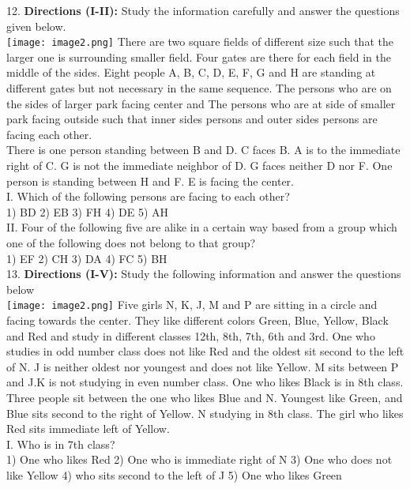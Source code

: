 \documentclass[
]{article}
\begin{document}
12. \textbf{Directions (I-II):} Study the information carefully and answer the questions given below.\\
\texttt{[image: image2.png]}
There are two square fields of different size such that the larger one is surrounding smaller
field. Four gates are there for each field in the middle of the sides. Eight people A, B, C, D, E,
F, G and H are standing at different gates but not necessary in the same sequence. The
persons who are on the sides of larger park facing center and The persons who are at side of
smaller park facing outside such that inner sides persons and outer sides persons are facing
each other.\\
There is one person standing between B and D. C faces B. A is to the immediate right of C. G
is not the immediate neighbor of D. G faces neither D nor F. One person is standing between
H and F. E is facing the center.\\

I. Which of the following persons are facing to each other?\\
1) BD \hspace{2mm}2) EB \hspace{2mm}3) FH \hspace{2mm}4) DE \hspace{2mm}5) AH\\

II. Four of the following five are alike in a certain way based from a group which one of the
following does not belong to that group?\\
1) EF \hspace{2mm}2) CH \hspace{2mm}3) DA \hspace{2mm}4) FC \hspace{2mm}5) BH\\

13. \textbf{Directions (I-V):} Study the following information and answer the questions below\\
\texttt{[image: image2.png]}
Five girls N, K, J, M and P are sitting in a circle and facing towards the center. They like
different colors Green, Blue, Yellow, Black and Red and study in different classes 12th, 8th,
7th, 6th and 3rd. One who studies in odd number class does not like Red and the oldest sit
second to the left of N. J is neither oldest nor youngest and does not like Yellow. M sits
between P and J.K is not studying in even number class. One who likes Black is in 8th class.
Three people sit between the one who likes Blue and N. Youngest like Green, and Blue sits
second to the right of Yellow. N studying in 8th class. The girl who likes Red sits immediate
left of Yellow.\\
I. Who is in 7th class?\\
1) One who likes Red \hspace{2mm}2) One who is immediate right of N
\hspace{2mm}3) One who does not like Yellow \hspace{2mm}4) who sits second to the left of J
\hspace{2mm}5) One who likes Green\\
\end{document}
